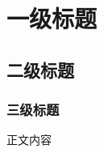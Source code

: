 \documentclass{demo}
\begin{document}


\keywords{}
\newpage

\section{一级标题}

\subsection{二级标题}

\subsubsection{三级标题}

正文内容\citep{ref1}


\newpage

\begin{enumerate}[label=\textbf{[}\arabic*\textbf{]}]
    \item \label{ref1} 
\end{enumerate}
\end{document}
